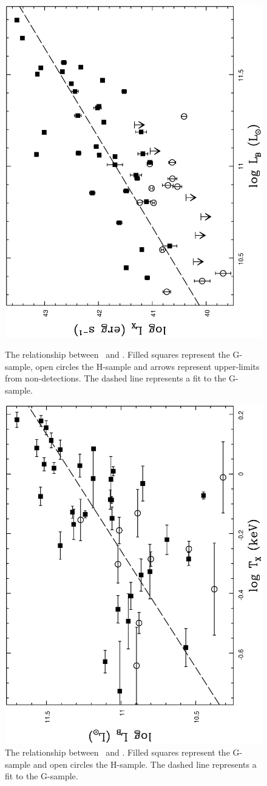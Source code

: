 \documentclass[usenatbib]{mn2e}
\begin{document}
\begin{figure}

  \includegraphics[height=\linewidth,angle=270]{fig_18.ps}
  \caption{The relationship between \LX\ and \LB.  Filled squares represent the
           G-sample, open circles the H-sample and arrows represent upper-limits
           from non-detections.  The dashed line represents a fit to the
           G-sample.}
   \label{fig_LX_LB}

  \includegraphics[height=\linewidth,angle=270]{fig_19.ps}
  \caption{The relationship between \LB\ and \TX.  Filled squares represent the
           G-sample and open circles the H-sample.  The dashed line represents a
           fit to the G-sample.}
  \label{fig_LB_TX}

\end{figure}
\end{document}
